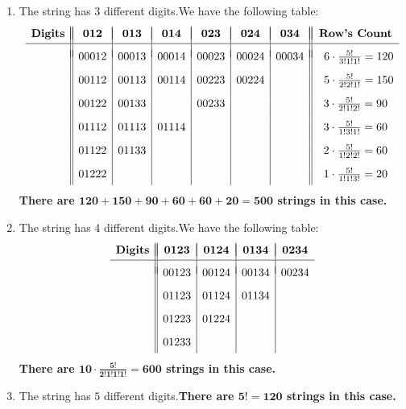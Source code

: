 \begin{enumerate}
\begin{enumerate}
 
        \item The string has $3$ different digits.We have the following table:
 \[\begin{array}{c||c|c|c|c|c|c||c} & & & & & & &  \\ [-2.5ex] \textbf{Digits} & \boldsymbol{012} & \boldsymbol{013} & \boldsymbol{014} & \boldsymbol{023} & \boldsymbol{024} & \boldsymbol{034} & \textbf{Row's Count} \\ [0.5ex] \hline & & & & & & & \\ [-1.5ex] & 00012 & 00013 & 00014 & 00023 & 00024 & 00034 & \hspace{2mm}6\cdot\frac{5!}{3!1!1!}=120 \\ [2ex]  & 00112 & 00113 & 00114 & 00223 & 00224 & & \hspace{2mm}5\cdot\frac{5!}{2!2!1!}=150 \\ [2ex]  & 00122 & 00133 & & 00233 & & & 3\cdot\frac{5!}{2!1!2!}=90 \\ [2ex]  & 01112 & 01113 & 01114 & & & & 3\cdot\frac{5!}{1!3!1!}=60 \\ [2ex] & 01122 & 01133 & & & & & 2\cdot\frac{5!}{1!2!2!}=60 \\ [2ex] & 01222 & & & & & & 1\cdot\frac{5!}{1!1!3!}=20 \\ [0.75ex] \end{array}\]\textbf{There are $\boldsymbol{120+150+90+60+60+20=500}$ strings in this case.} 

 
        \item The string has $4$ different digits.We have the following table:
 \[\begin{array}{c||c|c|c|c} & & & & \\ [-2.5ex] \textbf{Digits} & \boldsymbol{0123} & \boldsymbol{0124} & \boldsymbol{0134} & \boldsymbol{0234} \\ [0.5ex] \hline & & & & \\ [-1.5ex] & 00123 & 00124 & 00134 & 00234 \\ [2ex]  & 01123 & 01124 & 01134 & \\ [2ex]  & 01223 & 01224 & & \\ [2ex]  & 01233 & & & \\ [0.75ex] \end{array}\]\textbf{There are $\boldsymbol{10\cdot\frac{5!}{2!1!1!1!}=600}$ strings in this case.} 

 
        \item The string has $5$ different digits.\textbf{There are $\boldsymbol{5!=120}$ strings in this case.}


\end{enumerate}
\end{enumerate}
